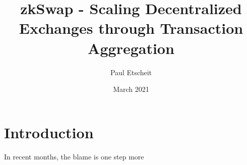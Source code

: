 \documentclass{book}
\title{zkSwap - Scaling Decentralized Exchanges through Transaction Aggregation}
\author{Paul Etscheit}
\date{March 2021}
\begin{document}
\begin{titlepage}
\maketitle
\end{titlepage}

\section{Introduction}
In recent months, the blame is one step more
\end{document}
